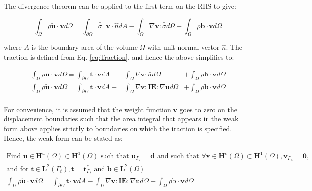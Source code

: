 \documentclass[10pt]{article}
\begin{document}
The divergence theorem can be applied to the first term on the RHS to give:

\begin{equation}
\int_{\Omega}\rho\ddot{\textbf{u}}\cdot \textbf{v}d\Omega=\int_{\partial\Omega}\bar{\bar{\sigma}}\cdot\textbf{v}\cdot\hat{n}dA-\int_{\Omega}\nabla\textbf{v}:\bar{\bar{\sigma}}d\Omega+\int_{\Omega}\rho\textbf{b}\cdot\textbf{v}d\Omega
\end{equation}

where \(A\) is the boundary area of the volume \(\Omega\) with unit normal vector \(\hat{n}\). The traction is defined from Eq. \eqref{eq:Traction}, and hence the above simplifies to:

\begin{equation}
\begin{aligned}
\int_{\Omega}\rho\ddot{\textbf{u}}\cdot \textbf{v}d\Omega=\int_{\partial\Omega}\textbf{t}\cdot\textbf{v}dA-& \int_{\Omega}\nabla\textbf{v}:\bar{\bar{\sigma}}d\Omega& +\int_{\Omega}\rho\textbf{b}\cdot\textbf{v}d\Omega\\
\int_{\Omega}\rho\ddot{\textbf{u}}\cdot \textbf{v}d\Omega=\int_{\partial\Omega}\textbf{t}\cdot\textbf{v}dA-& \int_{\Omega}\nabla\textbf{v}:\textbf{IE}:\nabla\textbf{u}d\Omega& +\int_{\Omega}\rho\textbf{b}\cdot\textbf{v}d\Omega\\
\end{aligned}
\end{equation}

For convenience, it is assumed that the weight function \(\textbf{v}\) goes to zero on the displacement boundaries such that the area integral that appears in the weak form above applies strictly to boundaries on which the traction is specified. Hence, the weak form can be stated as:

\begin{equation}
\label{eq:WeakFormQ1}
\begin{aligned}
\text{Find }\textbf{u}\in \textbf{H}^u(\Omega)\subset \textbf{H}^1(\Omega) \text{ such that } \textbf{u}_{\Gamma_u}=\textbf{d} \text{ and such that }\forall\textbf{v} \in \textbf{H}^v(\Omega)\subset \textbf{H}^1(\Omega), \textbf{v}_{\Gamma_u}=\textbf{0},\\
\text{and for }\textbf{t}\in\textbf{L}^2(\Gamma_t), \textbf{t}=\textbf{t}^{*}_{\Gamma_t}\text{ and }\textbf{b}\in\textbf{L}^2(\Omega)\\
\int_{\Omega}\rho\ddot{\textbf{u}}\cdot \textbf{v}d\Omega=\int_{\partial\Omega}\textbf{t}\cdot\textbf{v}dA- \int_{\Omega}\nabla\textbf{v}:\textbf{IE}:\nabla\textbf{u}d\Omega +\int_{\Omega}\rho\textbf{b}\cdot\textbf{v}d\Omega\\
\end{aligned}
\end{equation}
\end{document}
